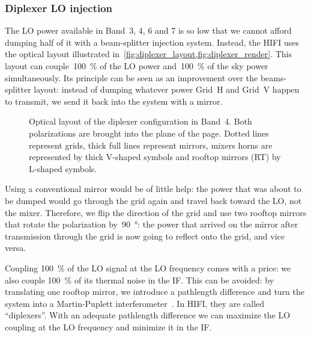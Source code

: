 \subsubsection{Diplexer LO injection}
\label{sec:diplexer_lo_injection}
The LO power available in Band~3, 4, 6 and 7 is so low that we cannot afford dumping half of it with a beam-splitter injection system.
Instead, the HIFI uses the optical layout illustrated in~\cref{fig:diplexer_layout,fig:diplexer_render}.
This layout can couple~\SI{100}{\percent} of the LO power and~\SI{100}{\percent} of the sky power simultaneously.
Its principle can be seen as an improvement over the beams-splitter layout:
instead of dumping whatever power Grid~H and Grid~V happen to transmit, we send it back into the system with a mirror.

\begin{figure}
    \centering
    \footnotesize
    
    \caption{Optical layout of the diplexer configuration in Band~4.
    Both polarizations are brought into the plane of the page.
    Dotted lines represent grids, thick full lines represent mirrors, mixers horns are represented by thick V-shaped symbols and rooftop mirrors (RT) by L-shaped symbols.
    }
    \label{fig:diplexer_layout}
\end{figure}

Using a conventional mirror would be of little help: the power that was about to be dumped would go through the grid again and travel back toward the LO, not the mixer.
Therefore, we flip the direction of the grid and use two rooftop mirrors that rotate the polarization by~\SI{90}{\degree}: the power that arrived on the mirror after transmission through the grid is now going to reflect onto the grid, and vice versa.

Coupling \SI{100}{\percent} of the LO signal at the LO frequency comes with a price: we also couple \SI{100}{\percent} of its thermal noise in the IF.
This can be avoided: by translating one rooftop mirror, we introduce a pathlength difference and turn the system into a Martin-Puplett interferometer~\parencite{martin1982polarizing}.
In HIFI, they are called ``diplexers''.
With an adequate pathlength difference we can maximize the LO coupling at the LO frequency and minimize it in the IF.

